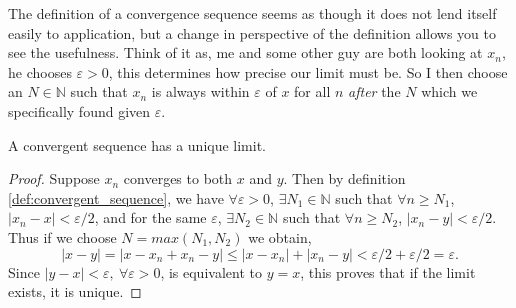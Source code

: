 \documentclass[../main.tex]{subfiles}
\begin{document}
    
    
    
    
    
    
    
    \begin{remark}
    The definition of a convergence sequence seems as though it does not lend itself easily to application, but a change in perspective of the definition allows you to see the usefulness. Think of it as, me and some other guy are both looking at \(x_n\), he chooses \( \varepsilon > 0\), this determines how precise our limit must be. So I then choose an \(N \in \mathbb{N}\) such that \(x_n\) is always within \(\varepsilon\) of \(x\) for all \(n\) \textit{after} the \(N\) which we specifically found given \(\varepsilon\).
    \end{remark}
    
    
    
    
    
    
    
    
    
    
    
    
    
    
    
    
    
    
    
    
    \begin{proposition} \label{prp:uniqueness_of_limit}
    A convergent sequence has a unique limit.
    \end{proposition}
    
    
    
    
    
    
    
    \begin{proof}
    Suppose \(x_n\) converges to both \(x\) and \(y\). Then by definition \ref{def:convergent_sequence}, we have \(\forall \varepsilon > 0\), \(\exists N_1 \in \mathbb{N}\) such that \( \forall n \geq N_1\), \(|x_n - x| < \varepsilon/2\), and for the same \(\varepsilon\), \(\exists N_2 \in \mathbb{N}\) such that \(\forall n \geq N_2\), \(|x_n - y| < \varepsilon/2\). Thus if we choose \(N = max(N_1, N_2)\) we obtain, 
    \[
    |x - y| = |x - x_n + x_n - y| \leq |x-x_n| + |x_n - y| < \varepsilon/2 + \varepsilon/2 = \varepsilon.
    \]
    Since \(|y-x| < \varepsilon, \ \forall \varepsilon > 0\), is equivalent to \(y=x\), this proves that if the limit exists, it is unique.  
    \end{proof}
    
    
    
    
    
\end{document}
